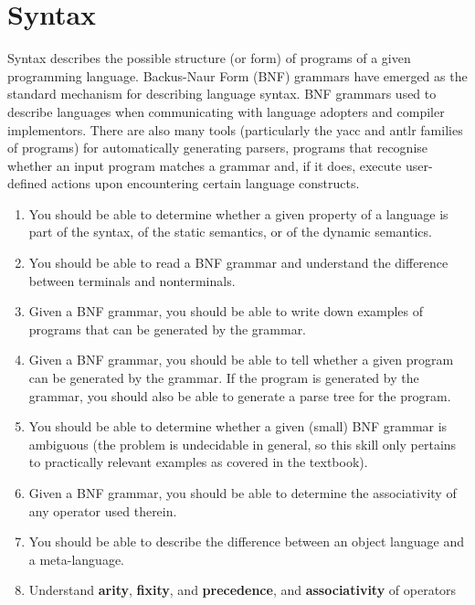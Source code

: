 \section{Syntax}\label{sec:Syntax}
Syntax describes the possible structure (or form) of programs of a given programming language.
Backus-Naur Form (BNF) grammars have emerged as the standard mechanism for describing language syntax.
BNF grammars used to describe languages when communicating with language adopters and compiler implementors.
There are also many tools (particularly the yacc and antlr families of programs) for automatically generating parsers, programs that recognise whether an input program matches a grammar and, if it does, execute user-defined actions upon encountering certain language constructs.

\begin{enumerate}[noitemsep]
\item You should be able to determine whether a given property of a language is part of the syntax, of the static semantics, or of the dynamic semantics.
\item You should be able to read a BNF grammar and understand the difference between terminals and nonterminals.
\item Given a BNF grammar, you should be able to write down examples of programs that can be generated by the grammar.
\item Given a BNF grammar, you should be able to tell whether a given program can be generated by the grammar. If the program is generated by the grammar, you should also be able to generate a parse tree for the program.
\item You should be able to determine whether a given (small) BNF grammar is ambiguous (the problem is undecidable in general, so this skill only pertains to practically relevant examples as covered in the textbook).
\item Given a BNF grammar, you should be able to determine the associativity of any operator used therein.
\item You should be able to describe the difference between an object language and a meta-language.
\item Understand \textbf{arity}, \textbf{fixity}, and \textbf{precedence}, and \textbf{associativity} of operators
\end{enumerate}

